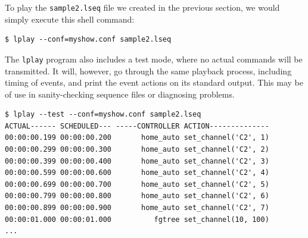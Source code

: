 \documentclass{article}
\begin{document}
To play the {\tt sample2.lseq} file we created in the previous section, we
would simply execute this shell command:
\begin{verbatim}
$ lplay --conf=myshow.conf sample2.lseq
\end{verbatim}

The {\tt lplay} program also includes a test mode, where no actual commands
will be transmitted.  It will, however, go through the same playback process,
including timing of events, and print the event actions on its standard
output.  This may be of use in sanity-checking sequence files or diagnosing
problems. 
\begin{verbatim}
$ lplay --test --conf=myshow.conf sample2.lseq
ACTUAL------ SCHEDULED--- -----CONTROLLER ACTION--------------
00:00:00.199 00:00:00.200       home_auto set_channel('C2', 1)
00:00:00.299 00:00:00.300       home_auto set_channel('C2', 2)
00:00:00.399 00:00:00.400       home_auto set_channel('C2', 3)
00:00:00.599 00:00:00.600       home_auto set_channel('C2', 4)
00:00:00.699 00:00:00.700       home_auto set_channel('C2', 5)
00:00:00.799 00:00:00.800       home_auto set_channel('C2', 6)
00:00:00.899 00:00:00.900       home_auto set_channel('C2', 7)
00:00:01.000 00:00:01.000          fgtree set_channel(10, 100)
...
\end{verbatim}
\end{document}
